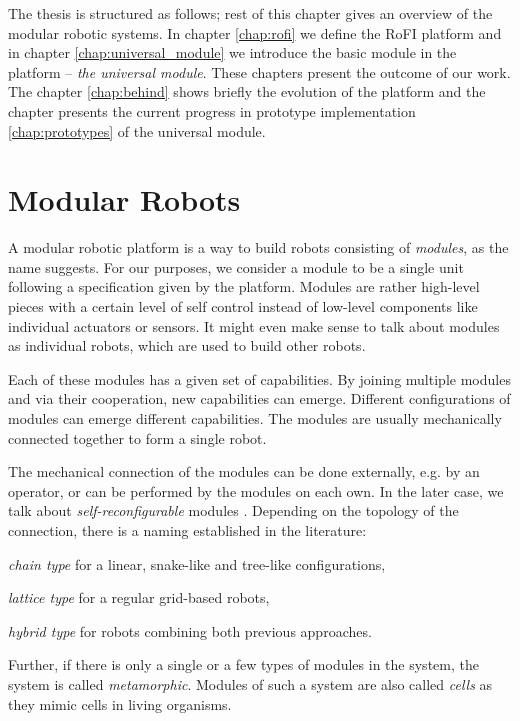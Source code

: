The thesis is structured as follows; rest of this chapter gives an overview of
the modular robotic systems. In chapter \ref{chap:rofi} we define the RoFI
platform and in chapter \ref{chap:universal_module} we introduce the basic
module in the platform -- \emph{the universal module}. These chapters present
the outcome of our work. The chapter \ref{chap:behind} shows briefly the
evolution of the platform and the chapter presents the current progress in
prototype implementation \ref{chap:prototypes} of the universal module.

\section{Modular Robots}

A modular robotic platform is a way to build robots consisting of
\emph{modules}, as the name suggests. For our purposes, we consider a module to
be a single unit following a specification given by the platform. Modules are
rather high-level pieces with a certain level of self control instead of
low-level components like individual actuators or sensors. It might even make
sense to talk about modules as individual robots, which are used to build other
robots\cite{brunete_current_2017}.

Each of these modules has a given set of capabilities. By joining multiple
modules and via their cooperation, new capabilities can emerge. Different
configurations of modules can emerge different capabilities. The modules are
usually mechanically connected together to form a single robot.

The mechanical connection of the modules can be done externally, e.g. by an
operator, or can be performed by the modules on each own. In the later case, we
talk about \emph{self-reconfigurable} modules \cite{brunete_current_2017}.
Depending on the topology of the connection, there is a naming established in
the literature\cite{brunete_current_2017}:
\begin{enumerate*}
    \item \emph{chain type} for a linear, snake-like and tree-like
    configurations,
    \item \emph{lattice type} for a regular grid-based robots,
    \item \emph{hybrid type} for robots combining both previous approaches.
\end{enumerate*}
Further, if there is only a single or a few types of modules in the system, the
system is called \emph{metamorphic}\cite{brunete_current_2017}. Modules of such
a system are also called \emph{cells} as they mimic cells in living organisms.

